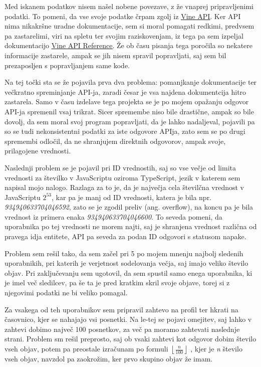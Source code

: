 \documentclass[a4paper,11pt]{article}
\begin{document}
Med iskanem podatkov nisem našel nobene povezave, z že vnaprej pripravljenimi podatki. To pomeni, da vse svoje podatke črpam zgolj iz \href{https://api.vineapp.com}{\underline{Vine API}}. Ker API nima nikakršne uradne dokumentacije, sem si moral pomagati redkimi, predvsem pa zastarelimi, viri na spletu ter svojim raziskovenjam, iz tega pa sem izpeljal dokumentacijo \href{https://github.com/markogresak/vine-data-mining/blob/master/API-reference.md}{\underline{Vine API Reference}}. Že ob času pisanja tega poročila so nekatere informacije zastarele, ampak se jih nisem spravil popravljati, saj sem bil prezaposljen s popravljanjem same kode.
\par
Na tej točki sta se že pojavila prva dva problema: pomanjkanje dokumentacije ter večkratno spreminjanje API-ja, zaradi česar je vsa najdena dokumentcija hitro zastarela. Samo v času izdelave tega projekta se je po mojem opažanju odgovor API-ja spremenil vsaj trikrat. Sicer spremembe niso bile drastične, ampak so bile dovolj, da sem moral svoj program popravljati, da je lahko nadaljeval, pojavili pa so se tudi nekonsistentni podatki za iste odgovore APIja, zato sem se po drugi spremembi odločil, da ne shranjujem direktnih odgovorov, ampak svoje, prilagojene vrednosti.
\par
Naslednji problem se je pojavil pri ID vrednostih, saj so vse večje od limita vrednosti za številko v JavaScriptu oziroma TypeScript, jezik v katerem sem napisal mojo nalogo. Razlaga za to je, da je največja cela številčna vrednost v JavaScriptu \(2^{53}\), kar pa je manj od ID vrednosti, katera je bila npr. \textit{934940633704046592}, zato se je zgodil preliv (ang. overflow), na koncu pa je bila vrednost iz primera enaka \textit{934940633704046600}. To seveda pomeni, da uporabnika po tej vrednosti ne morem najti, saj je shranjena vrednost različna od pravega idja entitete, API pa seveda za podan ID odgovori s statusom napake.
\par
Problem sem rešil tako, da sem začel pri 5 po mojem mnenju najbolj sledenih uporabnikih, pri katerih je verjetnost sodelovanja večja, saj imajo veliko število objav. Pri zaključevanju sem ugotovil, da sem spustil samo enega uporabnika, ki je imel več sledilcev, pa še ta je pred kratkim skril svoje objave, torej si z njegovimi podatki ne bi veliko pomagal.
\par
Za vsakega od teh uporabnikov sem pripravil zahtevo na profil ter hkrati na časovnico, kjer se nahajajo vsi posnetki. Na le-tej se pojavi omejitev, saj lahko v zahtevi dobimo največ 100 posnetkov, za več pa moramo zahtevati naslednje strani. Problem sm rešil preprosto, saj ob vsaki zahtevi kot odgovor dobim število vseh objav, potem pa preostale izračunam po formuli \(\left \lfloor{\frac{n}{100}}\right \rfloor\) , kjer je \textit{n} število vseh objav, navzdol pa zaokrožim, ker prvo skupino objav že imam.
\end{document}
